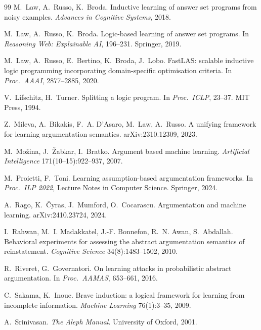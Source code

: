 \documentclass[review,12pt]{elsarticle}
\theoremstyle{definition}
\theoremstyle{remark}
\begin{document}
\begin{thebibliography}{99}
M.~Law, A.~Russo, K.~Broda.
Inductive learning of answer set programs from noisy examples.
\emph{Advances in Cognitive Systems}, 2018.

M.~Law, A.~Russo, K.~Broda.
Logic-based learning of answer set programs.
In \emph{Reasoning Web: Explainable AI}, 196--231. Springer, 2019.

M.~Law, A.~Russo, E.~Bertino, K.~Broda, J.~Lobo.
FastLAS: scalable inductive logic programming incorporating domain-specific
optimisation criteria.
In \emph{Proc.\ AAAI}, 2877--2885, 2020.

V.~Lifschitz, H.~Turner.
Splitting a logic program.
In \emph{Proc.\ ICLP}, 23--37. MIT Press, 1994.

Z.~Mileva, A.~Bikakis, F.~A. D'Asaro, M.~Law, A.~Russo.
A unifying framework for learning argumentation semantics.
arXiv:2310.12309, 2023.

M.~Mo\v{z}ina, J.~\v{Z}abkar, I.~Bratko.
Argument based machine learning.
\emph{Artificial Intelligence} 171(10--15):922--937, 2007.

M.~Proietti, F.~Toni.
Learning assumption-based argumentation frameworks.
In \emph{Proc.\ ILP 2022}, Lecture Notes in Computer Science. Springer, 2024.

A.~Rago, K.~{\v{C}}yras, J.~Mumford, O.~Cocarascu.
Argumentation and machine learning.
arXiv:2410.23724, 2024.

I.~Rahwan, M.~I. Madakkatel, J.-F. Bonnefon, R.~N. Awan, S.~Abdallah.
Behavioral experiments for assessing the abstract argumentation semantics of
reinstatement.
\emph{Cognitive Science} 34(8):1483--1502, 2010.

R.~Riveret, G.~Governatori.
On learning attacks in probabilistic abstract argumentation.
In \emph{Proc.\ AAMAS}, 653--661, 2016.

C.~Sakama, K.~Inoue.
Brave induction: a logical framework for learning from incomplete information.
\emph{Machine Learning} 76(1):3--35, 2009.

A.~Srinivasan.
\emph{The Aleph Manual}.
University of Oxford, 2001.

\end{thebibliography}
\end{document}
